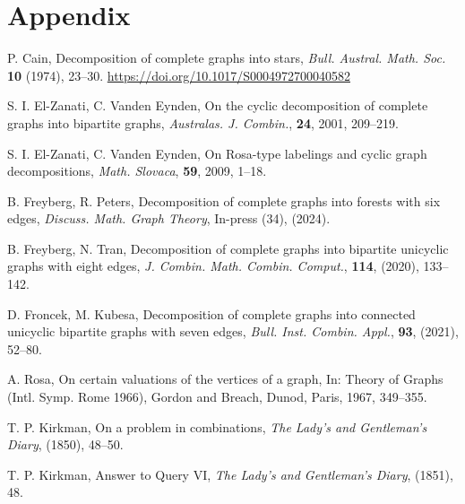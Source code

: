 \chapter{Appendix} \label{chap:Appendix}


\newpage

\newpage
    
    

    \begin{thebibliography}{20}
    
    P. Cain, 
    Decomposition of complete graphs into stars, 
    \textit{Bull. Austral. Math. Soc.} \textbf{10} (1974), 23--30.
    \url{https://doi.org/10.1017/S0004972700040582}
    
    S. I. El-Zanati, C. Vanden Eynden,
    On the cyclic decomposition of complete graphs into bipartite graphs,
    \textit{Australas. J. Combin.}, \textbf{24}, 2001, 209--219.
    
    S. I. El-Zanati, C. Vanden Eynden,
    On Rosa-type labelings and cyclic graph decompositions,
    \textit{Math. Slovaca}, \textbf{59}, 2009, 1--18.
    
    B. Freyberg, R. Peters, 
    Decomposition of complete graphs into forests with six edges, 
    \textit{Discuss. Math. Graph Theory}, In-press (34), (2024).
    
    B. Freyberg, N. Tran, 
    Decomposition of complete graphs into bipartite unicyclic graphs with eight edges, 
    \textit{J. Combin. Math. Combin. Comput.}, \textbf{114}, (2020), 133--142.
    
    D. Froncek, M. Kubesa, 
    Decomposition of complete graphs into connected unicyclic bipartite graphs with seven edges,
    \textit{Bull. Inst. Combin. Appl.}, \textbf{93}, (2021), 52--80.
    
    A. Rosa,
    On certain valuations of the vertices of a graph,
    In: Theory of Graphs (Intl. Symp. Rome 1966), Gordon and Breach, Dunod, Paris,
    1967, 349--355.

    T. P. Kirkman, 
    On a problem in combinations, 
    \textit{The Lady's and Gentleman's Diary}, (1850), 48--50.

    T. P. Kirkman, 
    Answer to Query VI, 
    \textit{The Lady's and Gentleman's Diary}, (1851), 48.
    
    \end{thebibliography}